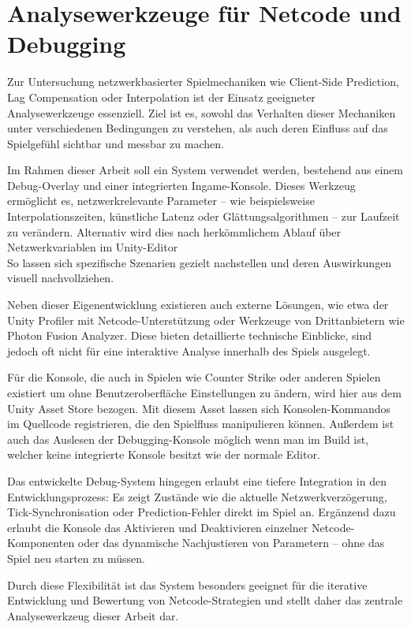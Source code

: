 \chapter{Analysewerkzeuge für Netcode und Debugging}

Zur Untersuchung netzwerkbasierter Spielmechaniken wie Client-Side Prediction, Lag Compensation oder Interpolation ist der Einsatz geeigneter Analysewerkzeuge essenziell. Ziel ist es, sowohl das Verhalten dieser Mechaniken unter verschiedenen Bedingungen zu verstehen, als auch deren Einfluss auf das Spielgefühl sichtbar und messbar zu machen.

Im Rahmen dieser Arbeit soll ein System verwendet werden, bestehend aus einem Debug-Overlay und einer integrierten Ingame-Konsole. Dieses Werkzeug ermöglicht es, netzwerkrelevante Parameter -- wie beispielsweise Interpolationszeiten, künstliche Latenz oder Glättungsalgorithmen -- zur Laufzeit zu verändern. Alternativ wird dies nach herkömmlichem Ablauf über Netzwerkvariablen im Unity-Editor  \\
So lassen sich spezifische Szenarien gezielt nachstellen und deren Auswirkungen visuell nachvollziehen.

Neben dieser Eigenentwicklung existieren auch externe Lösungen, wie etwa der Unity Profiler mit Netcode-Unterstützung oder Werkzeuge von Drittanbietern wie Photon Fusion Analyzer. Diese bieten detaillierte technische Einblicke, sind jedoch oft nicht für eine interaktive Analyse innerhalb des Spiels ausgelegt.

Für die Konsole, die auch in Spielen wie Counter Strike oder anderen Spielen existiert um ohne Benutzeroberfläche Einstellungen zu ändern, wird hier aus dem Unity Asset Store bezogen. \cite{}
Mit diesem Asset lassen sich Konsolen-Kommandos im Quellcode registrieren, die den Spielfluss manipulieren können. Außerdem ist auch das Auslesen der Debugging-Konsole möglich wenn man im Build ist, welcher keine integrierte Konsole besitzt wie der normale Editor.

Das entwickelte Debug-System hingegen erlaubt eine tiefere Integration in den Entwicklungsprozess: Es zeigt Zustände wie die aktuelle Netzwerkverzögerung, Tick-Synchronisation oder Prediction-Fehler direkt im Spiel an. Ergänzend dazu erlaubt die Konsole das Aktivieren und Deaktivieren einzelner Netcode-Komponenten oder das dynamische Nachjustieren von Parametern -- ohne das Spiel neu starten zu müssen.

Durch diese Flexibilität ist das System besonders geeignet für die iterative Entwicklung und Bewertung von Netcode-Strategien und stellt daher das zentrale Analysewerkzeug dieser Arbeit dar.


